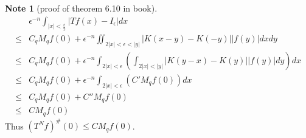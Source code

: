 \documentclass{report}
\theoremstyle{definition}
\newtheorem{note}{Note}
\theoremstyle{definition}
\theoremstyle{plain}
\numberwithin{theorem}{subsection}
\numberwithin{remark}{subsection}
\newcommand{\abs}[1]{\left\lvert#1\right\rvert}
\begin{document}
\begin{note}[proof of theorem 6.10 in book]
\begin{align*}
             & \epsilon^{-n}\int_{\abs{x}<\frac{\epsilon}{2}}{\abs{Tf(x)-I_\epsilon}dx}                                    \\
        \leq & C_qM_qf(0)+\epsilon^{-n}\iint_{2\abs{x}<\epsilon<\abs{y}}{\abs{K(x-y)-K(-y)}\abs{f(y)}dxd y}                \\
        \leq & C_qM_qf(0)+\epsilon^{-n}\int_{2\abs{x}<\epsilon}{(\int_{2\abs{x}<\abs{y}}\abs{K(y-x)-K(y)}\abs{f(y)}d y)dx} \\
        \leq & C_qM_qf(0)+\epsilon^{-n}\int_{2\abs{x}<\epsilon}{(C'M_q f(0))dx}                                            \\
        \leq & C_qM_qf(0)+C''M_q f(0)                                                                                      \\
        \leq & CM_q f(0)
    \end{align*}
    Thus  $(T^Nf)^\#(0)\leq CM_qf(0)$.
\end{note}
\end{document}
